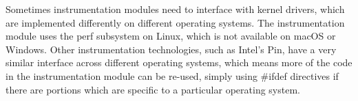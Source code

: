 Sometimes instrumentation modules need to interface with kernel drivers, which are
implemented differently on different operating systems. The \IPT{}
instrumentation module uses the perf subsystem on Linux, which is not available
on macOS or Windows. Other instrumentation technologies, such as Intel's
Pin,\cite{pin} have a very similar interface across different operating
systems, which means more of the code in the instrumentation module can be
re-used, simply using \#ifdef directives if there are portions which are
specific to a particular operating system.
